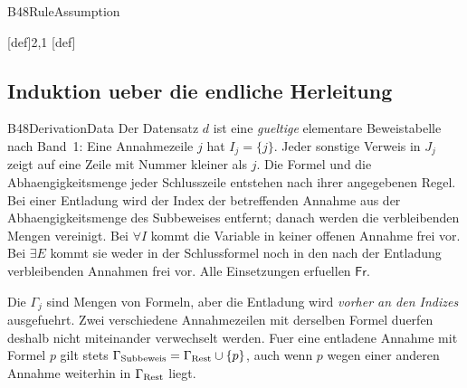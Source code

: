 {B48RuleAssumption}{
}
\begin{tabproofsplitwide}
  {\rA}
  {\rA}
  {[def]{2,1}}
  {}
  {[def]{}}
 \closeproofpartwide
\end{tabproofsplitwide}

\subsection{Induktion ueber die endliche Herleitung}

{B48DerivationData}{
}
Der Datensatz \(d\) ist eine \emph{gueltige} elementare Beweistabelle
nach Band~1: Eine Annahmezeile \(j\) hat \(I_j=\{j\}\).
Jeder sonstige Verweis in \(J_j\) zeigt auf eine Zeile mit Nummer
kleiner als \(j\). Die Formel und die Abhaengigkeitsmenge jeder
Schlusszeile entstehen nach ihrer angegebenen Regel.
Bei einer Entladung wird der Index der betreffenden Annahme aus
der Abhaengigkeitsmenge des Subbeweises entfernt; danach werden die
verbleibenden Mengen vereinigt.
Bei \(\forall I\) kommt die Variable in keiner offenen Annahme frei
vor. Bei \(\exists E\) kommt sie weder in der Schlussformel noch in
den nach der Entladung verbleibenden Annahmen frei vor.
Alle Einsetzungen erfuellen \(\mathsf{Fr}\).

Die \(\Gamma_j\) sind Mengen von Formeln, aber die Entladung wird
\emph{vorher an den Indizes} ausgefuehrt. Zwei verschiedene
Annahmezeilen mit derselben Formel duerfen deshalb nicht
miteinander verwechselt werden. Fuer eine entladene Annahme mit
Formel \(p\) gilt stets
\(\Gamma_{\rm Subbeweis}=\Gamma_{\rm Rest}\cup\{p\}\), auch wenn
\(p\) wegen einer anderen Annahme weiterhin in \(\Gamma_{\rm Rest}\)
liegt.

